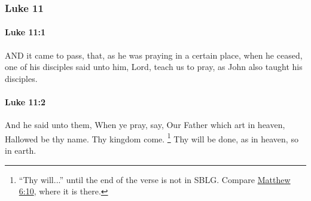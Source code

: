 	\subsubsection{Luke 11} %
		\label{LUKE-11}
		
		\paragraph{Luke 11:1} %
			\label{LUKE-11-1}

			AND it came to pass, that, as he was praying in a certain place, when he ceased, one of his disciples said unto him, Lord, teach us to pray, as John also taught his disciples.

			\begin{framed}
			\scriptsize
				\begin{compactdesc}
					\item[SBLG] 
				\end{compactdesc}
			\end{framed}

		\paragraph{Luke 11:2} %
			\label{LUKE-11-2}

			And he said unto them, When ye pray, say, Our Father which art in heaven, Hallowed be thy name. Thy kingdom come.
				\footnote{%
					``Thy will...'' until the end of the verse is not in SBLG. Compare \hyperref[MATTHEW-6-10]{Matthew 6:10}, where it is there.
					}%
			Thy will be done, as in heaven, so in earth.

